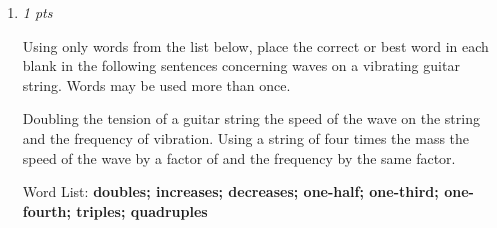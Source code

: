 \documentclass[11pt]{article}
\begin{document}
\begin{enumerate}[leftmargin=*,label=\textbf{Question \arabic*.}]
\item \hfill \textit{1 pts}

Using only words from the list below, place the correct or best word in each blank in the following sentences concerning waves on a vibrating guitar string. Words may be used more than once.

Doubling the tension of a guitar string
 the speed of the wave on the string and
 the frequency of vibration. Using a string of four times the mass
 the speed of the wave by a factor of
 and
 the frequency by the same factor.



Word List: \textbf{doubles; increases; decreases; one-half; one-third; one-fourth; triples; quadruples}

\end{enumerate}
\end{document}

